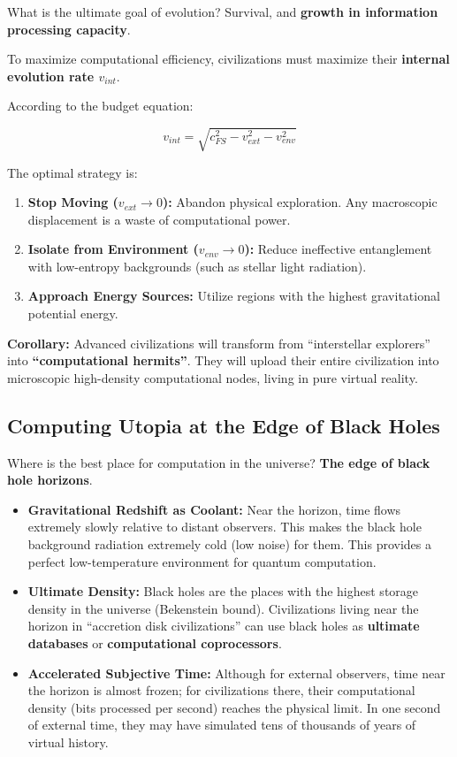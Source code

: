 \documentclass[11pt,a4paper,twoside]{book}
\begin{document}
What is the ultimate goal of evolution? Survival, and \textbf{growth in information processing capacity}.

To maximize computational efficiency, civilizations must maximize their \textbf{internal evolution rate $v_{int}$}.

According to the budget equation:

$$v_{int} = \sqrt{c_{FS}^2 - v_{ext}^2 - v_{env}^2}$$

The optimal strategy is:

\begin{enumerate}
\item \textbf{Stop Moving ($v_{ext} \to 0$):} Abandon physical exploration. Any macroscopic displacement is a waste of computational power.

\item \textbf{Isolate from Environment ($v_{env} \to 0$):} Reduce ineffective entanglement with low-entropy backgrounds (such as stellar light radiation).

\item \textbf{Approach Energy Sources:} Utilize regions with the highest gravitational potential energy.
\end{enumerate}

\textbf{Corollary:} Advanced civilizations will transform from ``interstellar explorers'' into \textbf{``computational hermits''}. They will upload their entire civilization into microscopic high-density computational nodes, living in pure virtual reality.

\subsection{Computing Utopia at the Edge of Black Holes}

Where is the best place for computation in the universe? \textbf{The edge of black hole horizons}.

\begin{itemize}
\item \textbf{Gravitational Redshift as Coolant:} Near the horizon, time flows extremely slowly relative to distant observers. This makes the black hole background radiation extremely cold (low noise) for them. This provides a perfect low-temperature environment for quantum computation.

\item \textbf{Ultimate Density:} Black holes are the places with the highest storage density in the universe (Bekenstein bound). Civilizations living near the horizon in ``accretion disk civilizations'' can use black holes as \textbf{ultimate databases} or \textbf{computational coprocessors}.

\item \textbf{Accelerated Subjective Time:} Although for external observers, time near the horizon is almost frozen; for civilizations there, their computational density (bits processed per second) reaches the physical limit. In one second of external time, they may have simulated tens of thousands of years of virtual history.
\end{itemize}
\end{document}

